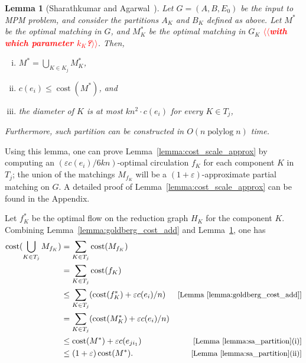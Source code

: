 \documentclass[11pt]{article}
\makeatletter
\def\polylog{\mathop{\mathrm{polylog}}}
\def\eps{\varepsilon}
\def\cost{\operatorname{cost}}
\theoremstyle{plain}
\newtheorem{lemma}{Lemma}[section]
\numberwithin{figure}{section}
\def\n@te#1{\textsf{\boldmath \textbf{$\langle\!\langle$#1$\rangle\!\rangle$}}\leavevmode}
\def\note#1{\textcolor{red}{\n@te{#1}}}
\makeatother
\begin{document}
\begin{lemma}[Sharathkumar and Agarwal~{\cite[\S3.5]{SA12}}]
\label{lemma:sa_partition}
%
Let $G = (A,B,E_0)$ be the input to MPM problem, and consider the partitions $A_K$ and $B_K$ defined as above.
Let $M^*$ be the optimal matching in $G$, and $M^*_K$ be the optimal matching
in $G_K$ \note{with which parameter $k_K$?}.
Then,
\begin{enumerate}[(i)]
\item $M^* = \bigcup_{K \in K_j} M^*_K$,
\item $c(e_i) \leq \cost(M^*)$, and
\item the diameter of $K$ is at most $kn^2 \cdot c(e_i)$ for every $K \in T_j$,
\end{enumerate}
Furthermore, such partition can be constructed in $O(n\polylog n)$ time.
\end{lemma}

Using this lemma, one can prove Lemma~\ref{lemma:cost_scale_approx} by computing an $(\eps c(e_i)/6kn)$-optimal
circulation $f_K$ for each component $K$ in $T_j$; the union of the matchings $M_{f_K}$ will be a $(1+\eps)$-approximate partial matching on $G$.
A detailed proof of Lemma~\ref{lemma:cost_scale_approx} can be found in the Appendix.

\begin{appendixproof}
Let $f^*_K$ be the optimal flow on the reduction graph $H_K$ for the component $K$.
Combining Lemma~\ref{lemma:goldberg_cost_add} and
Lemma~\ref{lemma:sa_partition}, one has
\begin{align*}
	\cost(\bigcup_{K \in T_j} M_{f_K})
		&= \sum_{K \in T_j} \cost(M_{f_K}) & \\
		&= \sum_{K \in T_j} \cost(f_K) & \\
		&\leq \sum_{K \in T_j} (\cost(f^*_K) + \eps c(e_i)/n) & \text{\small [Lemma~\ref{lemma:goldberg_cost_add}]} \\
		&= \sum_{K \in T_j} (\cost(M^*_K) + \eps c(e_i)/n) & \\
		&\leq \cost(M^*) + \eps c(e_{ji_1}) & \text{\small [Lemma~\ref{lemma:sa_partition}(i)]} \\
		&\leq (1 + \eps) \cost(M^*). & \text{\small[Lemma~\ref{lemma:sa_partition}(ii)]}
\end{align*}
\end{appendixproof}
\end{document}
